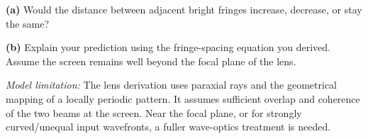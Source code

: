 \documentclass[11pt]{article}
\newcommand{\answerspace}[1]{\vspace{#1}}
\begin{document}
\begin{enumerate}[resume]
\textbf{(a)} Would the distance between adjacent bright fringes increase, decrease, or stay the same?

\textbf{(b)} Explain your prediction using the fringe-spacing equation you derived. Assume the screen remains well beyond the focal plane of the lens.
\answerspace{0.62in}
\end{enumerate}
\vfill
\small\textit{Model limitation:} The lens derivation uses paraxial rays and the geometrical mapping of a locally periodic pattern. It assumes sufficient overlap and coherence of the two beams at the screen. Near the focal plane, or for strongly curved/unequal input wavefronts, a fuller wave-optics treatment is needed.
\end{document}

